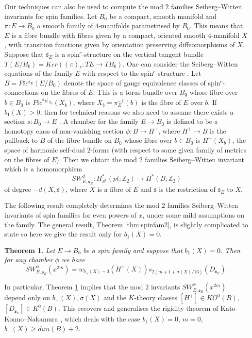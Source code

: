 \documentclass{amsart}
\newtheorem{theorem}{Theorem}[section]
\theoremstyle{definition}
\theoremstyle{remark}
\numberwithin{equation}{section}
\begin{document}
Our techniques can also be used to compute the mod $2$ families Seiberg--Witten invariants for spin families. Let $B_0$ be a compact, smooth manifold and $\pi : E \to B_0$ a smooth family of $4$-manifolds parametrised by $B_0$. This means that $E$ is a fibre bundle with fibres given by a compact, oriented smooth $4$-manifold $X$, with transition functions given by orientation preserving diffeomorphisms of $X$. Suppose that $\mathfrak{s}_E$ is a spin$^c$-structure on the vertical tangent bundle $T(E/B_0) = Ker( (\pi)_* : TE \to TB_0 )$. One can consider the Seiberg--Witten equations of the family $E$ with respect to the spin$^c$-structure \cite{bk1,bk,liliu,liu,na1,rub1,rub3}. Let $B = Pic^{\mathfrak{s}_E}(E/B_0)$ denote the space of gauge equivalence classes of spin$^c$-connections on the fibres of $E$. This is a torus bundle over $B_0$ whose fibre over $b \in B_0$ is $Pic^{\mathfrak{s}_E|_{X_b}}(X_b)$, where $X_b = \pi_E^{-1}(b)$ is the fibre of $E$ over $b$. If $b_1(X)>0$, then for technical reasons we also need to assume there exists a section $s : B_0 \to E$ \cite[Example 2.4]{bk}. A chamber for the family $E \to B_0$ is defined to be a homotopy class of non-vanishing section $\phi : B \to H^+$, where $H^+ \to B$ is the pullback to $B$ of the fibre bundle on $B_0$ whose fibre over $b \in B_0$ is $H^+(X_b)$, the space of harmonic self-dual $2$-forms (with respect to some given family of metrics on the fibres of $E$). Then we obtain the mod $2$ families Seiberg--Witten invariant which is a homomorphism
\[
SW^\phi_{E,\mathfrak{s}_E} : H^*_{S^1}(pt ; \mathbb{Z}_2) \to H^*(B ; \mathbb{Z}_2)
\]
of degree $-d(X,\mathfrak{s})$, where $X$ is a fibre of $E$ and $\mathfrak{s}$ is the restriction of $\mathfrak{s}_E$ to $X$.

The following result completely determines the mod $2$ families Seiberg--Witten invariants of spin families for even powers of $x$, under some mild assumptions on the family. The general result, Theorem \ref{thm:spinfam2}, is slightly complicated to state so here we give the result only for $b_1(X)=0$.

\begin{theorem}\label{thm:thm3}
Let $E \to B_0$ be a spin family and suppose that $b_1(X)=0$. Then for any chamber $\phi$ we have
\[
SW^\phi_{E,\mathfrak{s}_E}( x^{2m} ) = w_{b_+(X)-3}(H^+(X)) s_{2(m+1+\sigma(X)/16)}(D_{\mathfrak{s}_E}).
\]
\end{theorem}

In particular, Theorem \ref{thm:thm3} implies that the mod $2$ invariants $SW^\phi_{E,\mathfrak{s}_E}(x^{2m})$ depend only on $b_+(X), \sigma(X)$ and the $K$-theory classes $[H^+] \in KO^0(B)$, $[D_{\mathfrak{s}_E}] \in K^0(B)$. This recovers and generalises the rigidity theorem of Kato--Konno--Nakamura \cite{kkn}, which deals with the case $b_1(X) = 0$, $m=0$, $b_+(X) \ge dim(B)+2$.
\end{document}

